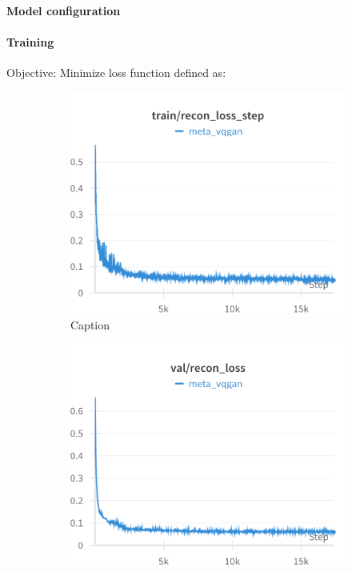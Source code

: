 \paragraph{Model configuration}

\paragraph{Training}
Objective: Minimize loss function defined as:

\begin{figure}[H]
\centering
\begin{subfigure}[h]{.45\linewidth}
    \includegraphics[width=\linewidth]{detailed_engineering/Meta VQGAN/charts/train_recon_loss_step.png}
    \caption{Caption}
    \label{fig:enter-label}
\end{subfigure}
\hfill
\begin{subfigure}[h]{.45\linewidth}
    \includegraphics[width=\linewidth]{detailed_engineering/Meta VQGAN/charts/val_recon_loss.png}

\end{subfigure}
\end{figure}
